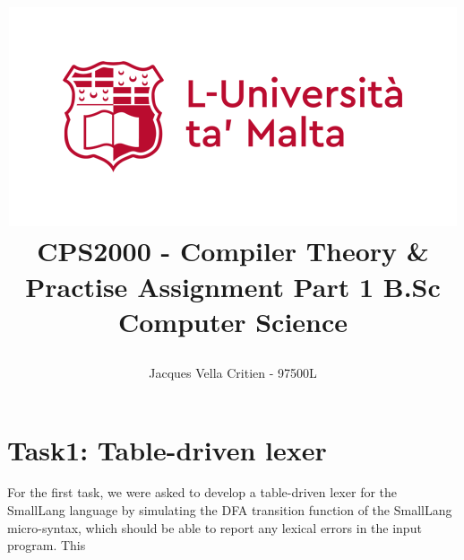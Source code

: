 \documentclass{article}
\begin{document}
			\title{\includegraphics[scale = .6]{uom.png}
				\linebreak 
				\textbf{CPS2000 - Compiler Theory \& Practise}\linebreak\linebreak
				\textbf{Assignment Part 1}\linebreak\linebreak
				\large{B.Sc Computer Science}
				\date{}
				\author{Jacques Vella Critien - 97500L}}
				
				\begin{titlepage}
					\maketitle
					\thispagestyle{empty}
				\end{titlepage}
				
				\tableofcontents
				\newpage
				
				\section{Task1: Table-driven lexer}
				
				For the first task, we were asked to develop a table-driven lexer for the SmallLang language by simulating the DFA transition function of the SmallLang micro-syntax, which should be able to report any lexical errors in the input program. This
				
\end{document}
